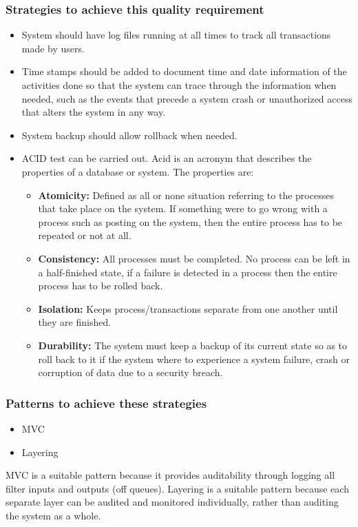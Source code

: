 \documentclass[a4paper,12pt]{article}
\begin{document}
 \subsubsection{Strategies to achieve this quality requirement}
 \begin{itemize}
 \item System should have log files running at all times to track all transactions made by users. 
 \item Time stamps should be added to document time and date information of the activities done so that the system can trace through the information when needed, such as the events that precede a system crash or unauthorized access
that alters the system in any way.
\item System backup should allow rollback when needed.
\item ACID test can be carried out. Acid is an acronym that describes the properties of a database or system. The properties are:
	\begin{itemize}
	\item \textbf{Atomicity:} Defined as all or none situation referring to the processes that take place on the 
	   system. If something were to go wrong with a process such as posting on the system,
	   then the entire process has to be repeated or not at all.
	\item \textbf{Consistency:} All processes must be completed. No process can be left in a half-finished state,
	     if a failure is detected in a process then the entire process has to be rolled back.
	\item \textbf{Isolation:} Keeps process/transactions separate from one another until they are finished.
	\item \textbf{Durability:} The system must keep a backup of its current state so as to roll back to it if
	    the system where to experience a system failure, crash or corruption of data due
	    to a security breach.
	\end{itemize}
 \end{itemize}

 \subsubsection{Patterns to achieve these strategies}
 \begin{itemize}
 \item MVC
 \item Layering
\end{itemize} 
 MVC is a suitable pattern because it provides auditability through logging all filter inputs and outputs (off queues). Layering is a suitable pattern because each separate layer can be audited and monitored individually, rather than auditing the system as a whole.
  
\end{document}
